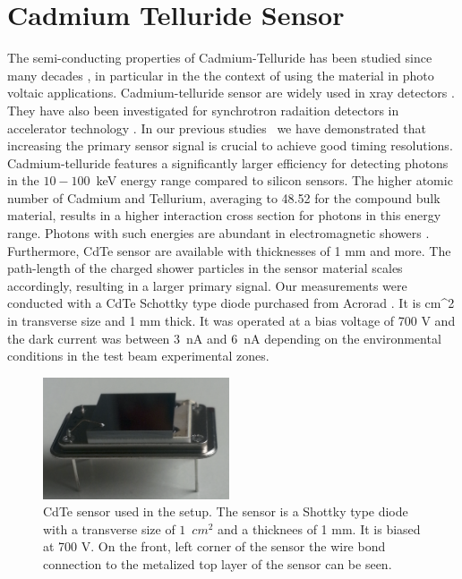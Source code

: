 %
%
%
\section{Cadmium Telluride Sensor}
\label{sec:siliconpad}
The semi-conducting properties of Cadmium-Telluride has been studied since many decades \cite{cdtegeneric}, 
in particular in the the context of using the material in photo voltaic applications.
Cadmium-telluride sensor are widely used in xray detectors \cite{cdtesensorsgeneric,cdtesensors1,cdtesensors2,cdtesensors3}. 
They have also been investigated for synchrotron radaition detectors in accelerator technology \cite{cdtelhc}.   
In our previous 
studies~\cite{Anderson:2015gha,MCPShowerMaxPaper,Ronzhin201552,SiliconTiming,PixelatedMCP,Anderson:2016ygg,Anderson:2015tia} 
we have demonstrated that increasing the primary sensor signal is crucial to achieve good timing resolutions.  
Cadmium-telluride features a significantly larger efficiency for detecting photons in the $10-100$~keV energy range 
compared to silicon sensors. The higher atomic number of Cadmium and Tellurium, averaging to 48.52 for the compound bulk material, results in a higher interaction cross section for photons in this energy range. 
Photons with such energies are abundant in electromagnetic showers \cite{showercomposition}. 
Furthermore, CdTe sensor are available with thicknesses of 1 mm and more. 
The path-length of the charged shower particles in the sensor material scales accordingly, 
resulting in a larger primary signal.
%
Our measurements were conducted with a CdTe Schottky type diode purchased from Acrorad \cite{acrorad}. 
It is \unit{cm}^{2} in transverse size and 1 mm thick.
It was operated at a bias voltage of 700 V and the dark current was between $3$~nA 
and $6$~nA depending on the environmental conditions in the test beam experimental 
zones.     
%
\begin{figure}[htbp] 
\centering
\includegraphics[width=0.49\textwidth]{figures/CdTeSensor.png} 
\caption{CdTe sensor used in the setup. The sensor is a Shottky type diode with a transverse size 
of $1$~$\unit{cm}^{2}$ and a thicknees of 1 mm. It is biased at 700 V. 
On the front, left corner of the sensor the wire bond connection 
to the metalized top layer of the sensor can be seen.} 
\label{fig:CdTeSensor} 
\end{figure} 
